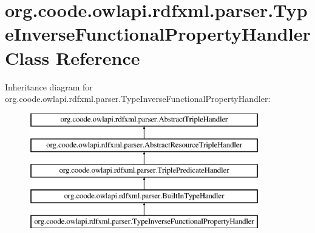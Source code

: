 \hypertarget{classorg_1_1coode_1_1owlapi_1_1rdfxml_1_1parser_1_1_type_inverse_functional_property_handler}{\section{org.\-coode.\-owlapi.\-rdfxml.\-parser.\-Type\-Inverse\-Functional\-Property\-Handler Class Reference}
\label{classorg_1_1coode_1_1owlapi_1_1rdfxml_1_1parser_1_1_type_inverse_functional_property_handler}
}
Inheritance diagram for org.\-coode.\-owlapi.\-rdfxml.\-parser.\-Type\-Inverse\-Functional\-Property\-Handler\-:\begin{figure}[H]
\begin{center}
\leavevmode
\includegraphics[height=5.000000cm]{classorg_1_1coode_1_1owlapi_1_1rdfxml_1_1parser_1_1_type_inverse_functional_property_handler}
\end{center}
\end{figure}
